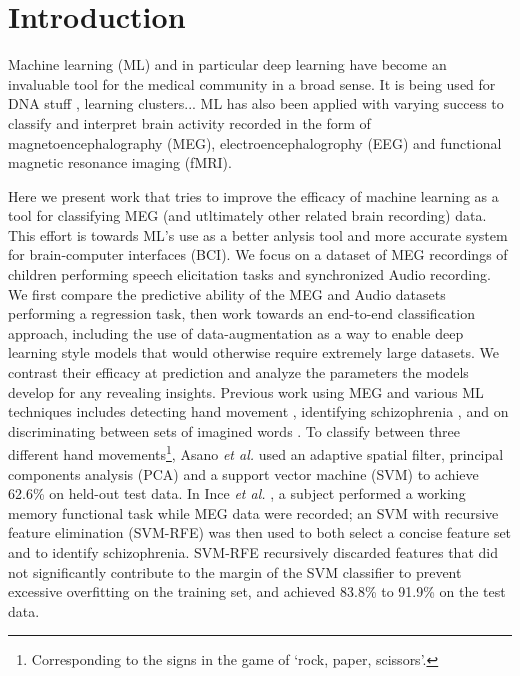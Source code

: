 \documentclass[utf8]{frontiersSCNS} %
\begin{document}
\section{Introduction}


Machine learning (ML) and in particular deep learning have become an invaluable tool for the medical community in a broad sense. It is being used for DNA stuff \cite{}, learning clusters... ML has also been applied with varying success to classify and interpret brain activity recorded in the form of magnetoencephalography (MEG), electroencephalogrophy (EEG) and functional magnetic resonance imaging (fMRI).

Here we present work that tries to improve the efficacy of machine learning as a tool for classifying MEG (and utltimately other related brain recording) data. This effort is towards ML's use as a better anlysis tool and more accurate system for brain-computer interfaces (BCI). We focus on a dataset of MEG recordings of children performing speech elicitation tasks and synchronized Audio recording. We first compare the predictive ability of the MEG and Audio datasets performing a regression task, then work towards an end-to-end classification approach, including the use of data-augmentation as a way to enable deep learning style models that would otherwise require extremely large datasets. We contrast their efficacy at prediction and analyze the parameters the models develop for any revealing insights. Previous work using MEG and various ML techniques includes detecting hand movement \cite{Asano2009}, identifying schizophrenia \cite{Ince2008}, and on discriminating between sets of imagined words \cite{Guimaraes2007}. To classify between three different hand movements\footnote{Corresponding to the signs in the game of `rock, paper, scissors'.}, Asano {\em et al.} \cite{Asano2009} used an adaptive spatial filter, principal components analysis (PCA) and a support vector machine (SVM) to achieve 62.6\% on held-out test data. In Ince {\em et al.} \cite{Ince2008}, a subject performed a working memory functional task while MEG data were recorded; an SVM with recursive feature elimination (SVM-RFE) was then used to both select a concise feature set and to identify schizophrenia. SVM-RFE recursively discarded features that did not significantly contribute to the margin of the SVM classifier to prevent excessive overfitting on the training set, and achieved 83.8\% to 91.9\% on the test data.
\end{document}
